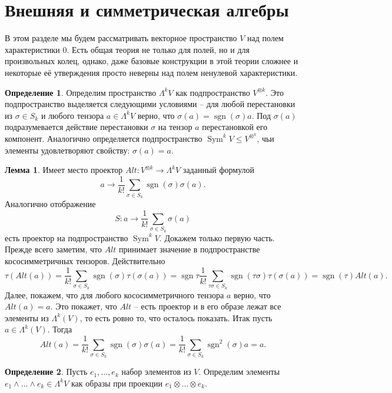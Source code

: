 \documentclass[10pt,a4paper,oneside]{book}
\theoremstyle{definition}
\newtheorem*{defn}{{\color{yellow!30!red} Определение}}
\newtheorem{lem}{{\color{green!50!black} Лемма}}
\newcommand{\Sym}{\operatorname{Sym}}
\newcommand{\sgn}{\operatorname{sgn}}
\def\dfn{\begin{defn}}
\def\edfn{\end{defn}}
\def\lm{\begin{lem}}
\def\elm{\end{lem}}
\begin{document}
\section{Внешняя и симметрическая алгебры}

В этом разделе мы будем рассматривать векторное пространство $V$ над полем характеристики $0$. Есть общая теория не только для полей, но и для произвольных колец, однако, даже базовые конструкции в этой теории сложнее и некоторые её утверждения просто неверны над полем ненулевой характеристики.

\dfn Определим пространство $\Lambda^k V$ как подпространство $V^{\otimes k}$. Это подпространство выделяется следующими условиями -- для любой перестановки из $\sigma \in S_k$ и любого тензора $a\in \Lambda^k V$ верно, что $\sigma(a)=\sgn(\sigma)a$. Под $\sigma(a)$ подразумевается действие перестановки $\sigma$ на тензор $a$ перестановкой его компонент. Аналогично определяется подпространство $\Sym^k V \leq V^{\otimes^k}$, чьи элементы удовлетворяют свойству: $\sigma(a)=a$.
\edfn

\lm Имеет место проектор $Alt \colon V^{\otimes k} \to \Lambda^k V$ заданный формулой 
$$a \to \frac{1}{k!} \sum_{\sigma \in S_k} \sgn (\sigma) \sigma(a).$$
Аналогично отображение  
$$S\colon a \to \frac{1}{k!} \sum_{\sigma \in S_k} \sigma(a)$$
есть проектор на подпространство $\Sym^k V$.
\proof Докажем только первую часть. Прежде всего заметим, что $Alt$ принимает значение в подпространстве кососимметричных тензоров. Действительно 
$$\tau(Alt(a))=\frac{1}{k!}\sum_{\sigma \in S_k}\sgn(\sigma) \tau(\sigma(a))= \sgn{\tau} \frac{1}{k!}\sum_{\tau\sigma \in S_k} \sgn(\tau\sigma) \tau(\sigma(a))=\sgn(\tau) Alt(a).$$
Далее, покажем, что для любого кососимметричного тензора $a$ верно, что $Alt(a)=a$. Это покажет, что $Alt$ -- есть проектор и в его образе лежат все элементы из $\Lambda^k(V)$, то есть ровно то, что осталось показать. Итак пусть $a\in \Lambda^k(V)$. Тогда 
$$Alt(a)=\frac{1}{k!} \sum_{\sigma \in S_k} \sgn (\sigma) \sigma (a)=\frac{1}{k!} \sum_{\sigma \in S_k} \sgn^2(\sigma) a=a.$$
\endproof
\elm

\dfn Пусть $e_1,\dots, e_k$ набор элементов из $V$. Определим элементы $e_1\wedge \dots \wedge e_k \in \Lambda^k V$ как образы при проекции $e_1\otimes \dots \otimes e_k$.
\edfn
\end{document}
